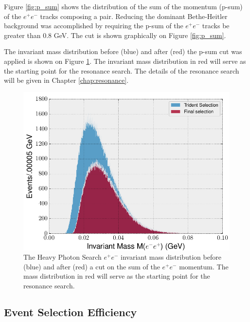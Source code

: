 Figure \ref{fig:p_sum} shows the distribution of the sum of the momentum (p-sum) 
of the $e^+e^-$ tracks composing a pair.  Reducing the dominant Bethe-Heitler 
background was accomplished by  requiring the p-sum of 
the $e^+e^-$ tracks be greater than 0.8 GeV. 
The cut is shown graphically on Figure \ref{fig:p_sum}.

The invariant mass
distribution before (blue) and after (red) the p-sum cut was applied is shown
on Figure \ref{fig:mass_selection}.  The invariant mass distribution in red 
will serve as the starting point for the resonance search.
The details of the resonance search will be given in Chapter \ref{chap:resonance}.

\begin{figure}[t]
    \centering
    \includegraphics[width=1.0\textwidth]{images/20160504_invariant_mass_selection.png}
    \caption{The Heavy Photon Search $e^+e^-$ invariant mass distribution before (blue) 
             and after (red) a cut on the sum of the $e^+e^-$ momentum. 
             The mass distribution in red 
             will serve as the starting point for the resonance search.}
    \label{fig:mass_selection}
\end{figure}

\subsection{Event Selection Efficiency}

